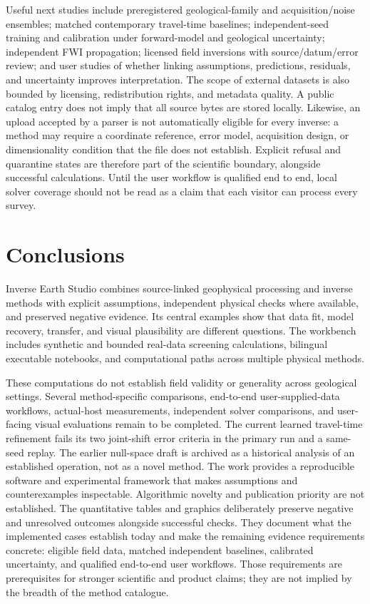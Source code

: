 Useful next studies include preregistered geological-family and
acquisition/noise ensembles; matched contemporary travel-time baselines;
independent-seed training and calibration under forward-model and
geological uncertainty; independent FWI propagation; licensed field
inversions with source/datum/error review; and user studies of whether
linking assumptions, predictions, residuals, and uncertainty improves
interpretation. The scope of external datasets is also bounded by
licensing, redistribution rights, and metadata quality. A public catalog
entry does not imply that all source bytes are stored locally. Likewise,
an upload accepted by a parser is not automatically eligible for every
inverse: a method may require a coordinate reference, error model,
acquisition design, or dimensionality condition that the file does not
establish. Explicit refusal and quarantine states are therefore part of
the scientific boundary, alongside successful calculations. Until the
user workflow is qualified end to end, local solver coverage should not
be read as a claim that each visitor can process every survey.

\section{Conclusions}\label{conclusions}

Inverse Earth Studio combines source-linked geophysical processing and
inverse methods with explicit assumptions, independent physical checks
where available, and preserved negative evidence. Its central examples
show that data fit, model recovery, transfer, and visual plausibility
are different questions. The workbench includes synthetic and bounded
real-data screening calculations, bilingual executable notebooks, and
computational paths across multiple physical methods.

These computations do not establish field validity or generality across
geological settings. Several method-specific comparisons, end-to-end
user-supplied-data workflows, actual-host measurements, independent
solver comparisons, and user-facing visual evaluations remain to be
completed. The current learned travel-time refinement fails its two
joint-shift error criteria in the primary run and a same-seed replay.
The earlier null-space draft is archived as a historical analysis of an
established operation, not as a novel method. The work provides a
reproducible software and experimental framework that makes assumptions
and counterexamples inspectable. Algorithmic novelty and publication
priority are not established.
The quantitative tables and graphics deliberately preserve negative and
unresolved outcomes alongside successful checks. They document what the
implemented cases establish today and make the remaining evidence
requirements concrete: eligible field data, matched independent
baselines, calibrated uncertainty, and qualified end-to-end user
workflows. Those requirements are prerequisites for stronger scientific
and product claims; they are not implied by the breadth of the method
catalogue.


